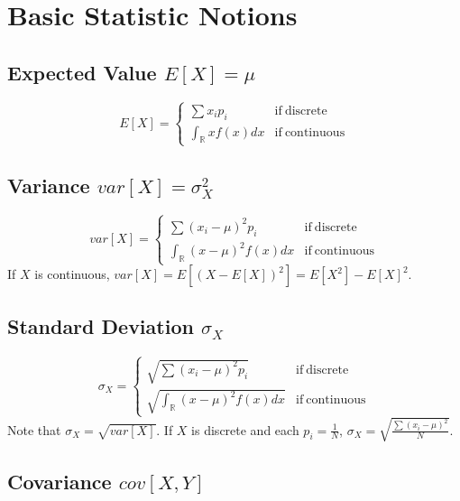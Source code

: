 \documentclass[../main.tex]{subfiles}
\begin{document}
    \section{Basic Statistic Notions}
        \subsection{Expected Value \texorpdfstring{$E[X]=\mu$}{}}
            \[
                E[X]=\left\{\begin{array}{ll}
                        \sum x_ip_i& \mathrm{if~discrete} \\[0.2cm]
                        \int_{\mathbb{R}}xf(x)dx & \mathrm{if~continuous}
                \end{array}\right.
            \]
        \subsection{Variance \texorpdfstring{$var[X]=\sigma_X^2$}{}}
            \[
                var[X]=\left\{\begin{array}{ll}
                        \sum (x_i-\mu)^2p_i& \mathrm{if~discrete} \\[0.2cm]
                        \int_{\mathbb{R}}(x-\mu)^2f(x)dx & \mathrm{if~continuous}
                \end{array}\right.
            \]
            If $X$ is continuous, $var[X]=E[(X-E[X])^2]=E[X^2] - E[X]^2$.
        \subsection{Standard Deviation \texorpdfstring{$\sigma_X$}{}}
            \[
                \sigma_X=\left\{\begin{array}{ll}
                        \sqrt{\sum(x_i-\mu)^2p_i}& \mathrm{if~discrete} \\[0.2cm]
                        \sqrt{\int_{\mathbb{R}}(x-\mu)^2f(x)dx} & \mathrm{if~continuous}
                \end{array}\right.
            \]
            Note that $\sigma_X=\sqrt{var[X]}$. If $X$ is discrete and each $p_i=\frac{1}{N}$, $\sigma_X=\sqrt{\frac{\sum(x_i-\mu)^2}{N}}$.
        \subsection{Covariance \texorpdfstring{$cov[X,Y]$}{}}
\end{document}

